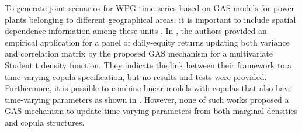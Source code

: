 \documentclass[a4paper]{IEEEtran}
\begin{document}

To generate joint scenarios for WPG time series based on GAS models for power plants belonging to different geographical areas, it is important to include spatial dependence information among these units \cite{souto2014high}. In \cite{creal2011dynamic}, the authors provided an empirical application for a panel of daily-equity returns updating both variance and correlation matrix by the proposed GAS mechanism for a multivariate Student t density function. They indicate the link between their framework to a time-varying copula specification, but no results and tests were provided. %
Furthermore, it is possible to combine linear models with copulas that also have time-varying parameters as shown in \cite{patton2006modelling,patton2009copula,patton2012copula}. However, none of such works proposed a GAS mechanism to update time-varying parameters from both marginal densities and copula structures. 
\end{document}
